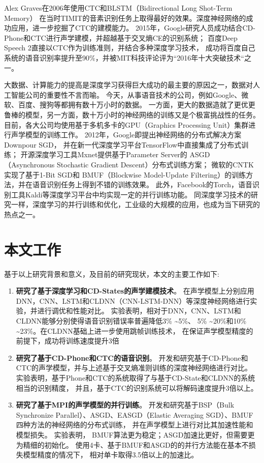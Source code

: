 Alex Graves在2006年使用CTC和BLSTM（Bidirectional Long Shot-Term Memory）
在当时TIMIT的音素识别任务上取得最好的效果。深度神经网络的成功应用，进一步挖掘了CTC的建模能力。
2015年，Google研究人员成功结合CD-Phone和CTC进行声学建模，并超越基于交叉熵CE的识别系统；
百度Deep Speech 2直接以CTC作为训练准则，并结合多种深度学习技术，
成功将百度自己系统的语音识别率提升至90\%，并被MIT科技评论评为“2016年十大突破技术“之一。

大数据、计算能力的提高是深度学习获得巨大成功的最主要的原因之一，数据对人工智能公司的重要性不言而喻。
今天，从事语音技术的公司，例如Google、微软、百度、搜狗等都拥有数十万小时的数据。
一方面，更大的数据造就了更优更鲁棒的模型，另一方面，数十万小时的神经网络的训练又是个极富挑战性的任务。
目前，各大公司均使用基于多机多卡的GPU（Graphics Processing Unit）集群进行声学模型的训练工作。
2012年，Google即提出神经网络的分布式解决方案Downpour SGD，
并在新一代深度学习平台TensorFlow中直接集成了分布式训练；
开源深度学习工具Mxnet提供基于Parameter Server的
ASGD（Asynchronous Stochastic Gradient Descent）分布式训练方案；
微软的CNTK实现了基于1-Bit SGD和
BMUF（Blockwise Model-Update Filtering）的训练方法，并在语音识别任务上得到不错的训练效果。
此外，Facebook的Torch，语音识别工具Kaldi等深度学习平台中均实现一定的并行训练功能。
同深度学习技术的研究一样，深度学习的并行训练和优化，工业级的大规模的应用，也成为当下研究的热点之一。

\section{本文工作}

基于以上研究背景和意义，及目前的研究现状，本文的主要工作如下:
\begin{enumerate}
\item \textbf{研究了基于深度学习和CD-States的声学建模技术}。
    在声学模型上分别应用DNN，CNN、LSTM和CLDNN（CNN-LSTM-DNN）等深度神经网络进行实验，并进行调优和性能对比。
    实验表明，相对于DNN，CNN、LSTM和CLDNN能够分别使得语音识别错误率普遍降低3\% \textasciitilde 5\%、
    5\% \textasciitilde 20\%和10\% \textasciitilde 23\%。在CLDNN基础上进一步使用跳帧训练技术，
在保证声学模型精度的前提下，成功将训练速度提升3倍
\item \textbf{研究了基于CD-Phone和CTC的语音识别}。
    开发和研究基于CD-Phone和CTC的声学模型，并与上述基于交叉熵准则训练的深度神经网络进行对比。
    实验表明，基于Phone和CTC的系统取得了与基于CD-State和CLDNN的系统相当的识别精度，
    并且，基于CTC的识别系统可以将解码速度提升3倍以上。
\item \textbf{研究了基于MPI的声学模型的并行训练}。
    开发和研究基于BSP（Bulk Synchronize Parallel）、ASGD、EASGD（Elastic Averaging SGD）、BMUF四种方法的神经网络的分布式训练，
    并在声学模型上进行对比其加速性能和模型损失。
    实验表明，
    BMUF算法更为稳定；ASGD加速比更好，但需要更为精细的初始化。
    使用4卡、基于BMUF和ASGD的的并行方法能在基本不损失模型精度的情况下，
    相对单卡取得3.5倍以上的加速比。
\end{enumerate}

